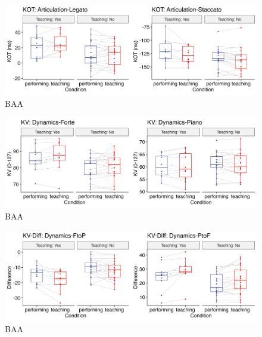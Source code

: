 \documentclass[
  man,floatsintext]{apa6}
\begin{document}
\begin{figure}
\includegraphics[width=1\linewidth]{manuscript_files/figure-latex/plot-art-teaching-1-1} \caption{\label{fig:art-teaching-1}BAA}\label{fig:plot-art-teaching-1}
\end{figure}

\begin{figure}
\includegraphics[width=1\linewidth]{manuscript_files/figure-latex/plot-dyn-teaching-1-1} \caption{\label{fig:dyn-teaching-1}BAA}\label{fig:plot-dyn-teaching-1}
\end{figure}

\begin{figure}
\includegraphics[width=1\linewidth]{manuscript_files/figure-latex/plot-dyn-diff-teaching-1-1} \caption{\label{fig:dyn-diff-teaching-1}BAA}\label{fig:plot-dyn-diff-teaching-1}
\end{figure}
\end{document}
